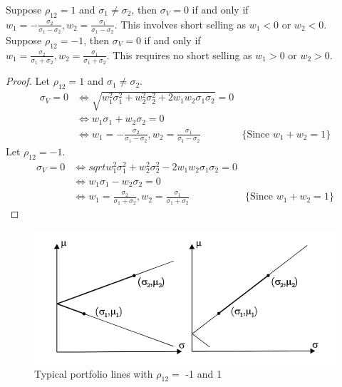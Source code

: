 \begin{theorem}
    Suppose $\rho_{12}=1$ and $\sigma_{1} \neq \sigma_{2}$, then $\sigma_{V}=0$ if and only if \\$w_{1}=-\frac{\sigma_{2}}{\sigma_{1}-\sigma_{2}},w_{2}=\frac{\sigma_{1}}{\sigma_{1}-\sigma_{2}}$. This involves short selling as $w_{1}<0$ or $w_{2}<0.$
    \\Suppose $\rho_{12}=-1$, then $\sigma_{V}=0$ if and only if \\$w_{1}=\frac{\sigma_{2}}{\sigma_{1}+\sigma_{2}},w_{2}=\frac{\sigma_{1}}{\sigma_{1}+\sigma_{2}}$. This requires no short selling as $w_{1}>0$ or $w_{2}>0.$
\end{theorem}
\begin{proof}
    Let $\rho_{12}=1$ and $\sigma_{1} \neq \sigma_{2}$.
    \begin{align*}
        \sigma_{V}=0 &\iff \sqrt{w_{1}^2\sigma_{1}^{2}+w_{2}^2\sigma_{2}^{2}+2w_{1}w_{2}\sigma_{1}\sigma_{2}}=0\\
        &\iff w_{1}\sigma_{1}+w_{2}\sigma_{2}=0\\
        &\iff w_{1}=-\frac{\sigma_{2}}{\sigma_{1}-\sigma_{2}},w_{2}=\frac{\sigma_{1}}{\sigma_{1}-\sigma_{2}} &\{\text{Since } w_{1}+w_{2}=1\}
    \end{align*}
    Let $\rho_{12}=-1$.
    \begin{align*}
        \sigma_{V}=0 &\iff sqrt{w_{1}^2\sigma_{1}^{2}+w_{2}^2\sigma_{2}^{2}-2w_{1}w_{2}\sigma_{1}\sigma_{2}}=0\\
        &\iff w_{1}\sigma_{1}-w_{2}\sigma_{2}=0\\
        &\iff w_{1}=\frac{\sigma_{2}}{\sigma_{1}+\sigma_{2}},w_{2}=\frac{\sigma_{1}}{\sigma_{1}+\sigma_{2}} &\{\text{Since } w_{1}+w_{2}=1\}
    \end{align*}
\end{proof}
\begin{figure}[htp]
    \centering
    \includegraphics[width=15cm]{5.jpg}
    \caption{Typical portfolio lines with $\rho_{12}=$ -1 and 1}
    \label{fig:SI}
\end{figure}

